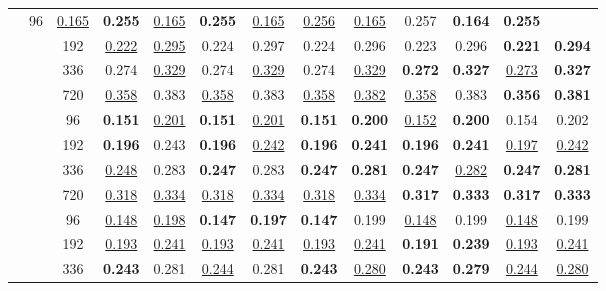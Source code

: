 \begin{table*}[!ht]
{\begin{tabular}{c|c|c|cc|cc|cc|cc|cc}
    		 & 96 &  \underline{0.165} & \textbf{0.255} &  \underline{0.165} & \textbf{0.255} &  \underline{0.165} & \underline{0.256} &  \underline{0.165} & 0.257 &  \textbf{0.164} & \textbf{0.255} \\
    		 & & 192 &  \underline{0.222} & \underline{0.295} &  0.224 & 0.297 &  0.224 & 0.296 &  0.223 & 0.296 &  \textbf{0.221} & \textbf{0.294} \\
    		 & & 336 &  0.274 & \underline{0.329} &  0.274 & \underline{0.329} &  0.274 & \underline{0.329} &  \textbf{0.272} & \textbf{0.327} &  \underline{0.273} & \textbf{0.327} \\
    		 & & 720 &  \underline{0.358} & 0.383 &  \underline{0.358} & 0.383 &  \underline{0.358} & \underline{0.382} &  \underline{0.358} & 0.383 &  \textbf{0.356} & \textbf{0.381} \\
    	\midrule
    	\multirow{8}{*}{\rotatebox[origin=c]{90}{\text{Weather}}}
    	& \multirow{4}{*}{\rotatebox[origin=c]{90}{\text{336}}}
    		 & 96 &  \textbf{0.151} & \underline{0.201} &  \textbf{0.151} & \underline{0.201} &  \textbf{0.151} & \textbf{0.200} &  \underline{0.152} & \textbf{0.200} &  0.154 & 0.202 \\
    		 & & 192 &  \textbf{0.196} & 0.243 &  \textbf{0.196} & \underline{0.242} &  \textbf{0.196} & \textbf{0.241} &  \textbf{0.196} & \textbf{0.241} &  \underline{0.197} & \underline{0.242} \\
    		 & & 336 &  \underline{0.248} & 0.283 &  \textbf{0.247} & 0.283 &  \textbf{0.247} & \textbf{0.281} &  \textbf{0.247} & \underline{0.282} &  \textbf{0.247} & \textbf{0.281} \\
    		 & & 720 &  \underline{0.318} & \underline{0.334} &  \underline{0.318} & \underline{0.334} &  \underline{0.318} & \underline{0.334} &  \textbf{0.317} & \textbf{0.333} &  \textbf{0.317} & \textbf{0.333} \\ \cmidrule{2-13}
    	& \multirow{4}{*}{\rotatebox[origin=c]{90}{\text{512}}}
    		 & 96 &  \underline{0.148} & \underline{0.198} &  \textbf{0.147} & \textbf{0.197} &  \textbf{0.147} & 0.199 &  \underline{0.148} & 0.199 &  \underline{0.148} & 0.199 \\
    		 & & 192 &  \underline{0.193} & \underline{0.241} &  \underline{0.193} & \underline{0.241} &  \underline{0.193} & \underline{0.241} &  \textbf{0.191} & \textbf{0.239} &  \underline{0.193} & \underline{0.241} \\
    		 & & 336 &  \textbf{0.243} & 0.281 &  \underline{0.244} & 0.281 &  \textbf{0.243} & \underline{0.280} &  \textbf{0.243} & \textbf{0.279} &  \underline{0.244} & \underline{0.280} \\

\end{tabular}}
\end{table*}
